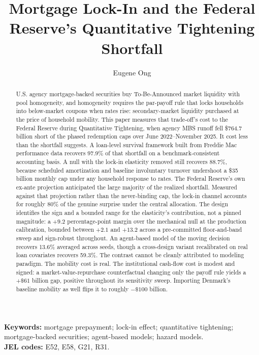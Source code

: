\documentclass[12pt]{article}
\title{Mortgage Lock-In and the Federal Reserve's Quantitative Tightening Shortfall}
\author{Eugene Ong}
\affil{Carnegie Mellon University}
\date{}
\begin{document}
\maketitle
\begin{abstract}
\noindent U.S. agency mortgage-backed securities buy To-Be-Announced market liquidity with pool homogeneity, and homogeneity requires the par-payoff rule that locks households into below-market coupons when rates rise: secondary-market liquidity purchased at the price of household mobility. This paper measures that trade-off's cost to the Federal Reserve during Quantitative Tightening, when agency MBS runoff fell \$764.7 billion short of the phased redemption caps over June 2022--November 2025. It cost less than the shortfall suggests. A loan-level survival framework built from Freddie Mac performance data recovers 97.9\% of that shortfall on a benchmark-consistent accounting basis. A null with the lock-in elasticity removed still recovers 88.7\%, because scheduled amortization and baseline involuntary turnover undershoot a \$35 billion monthly cap under any household response to rates. The Federal Reserve's own ex-ante projection anticipated the large majority of the realized shortfall. Measured against that projection rather than the never-binding cap, the lock-in channel accounts for roughly 80\% of the genuine surprise under the central allocation. The design identifies the sign and a bounded range for the elasticity's contribution, not a pinned magnitude: a $+9.2$ percentage-point margin over the mechanical null at the production calibration, bounded between $+2.1$ and $+13.2$ across a pre-committed floor-and-band sweep and sign-robust throughout. An agent-based model of the moving decision recovers 13.6\% averaged across seeds, though a cross-design variant recalibrated on real loan covariates recovers 59.3\%. The contrast cannot be cleanly attributed to modeling paradigm. The mobility cost is real. The institutional cash-flow cost is modest and signed: a market-value-repurchase counterfactual changing only the payoff rule yields a $+\$61$ billion gap, positive throughout its sensitivity sweep. Importing Denmark's baseline mobility as well flips it to roughly $-\$100$ billion.
\end{abstract}

\vspace{0.5\baselineskip}
{\footnotesize\noindent\textbf{Keywords:} mortgage prepayment; lock-in effect; quantitative tightening; mortgage-backed securities; agent-based models; hazard models.\\
\textbf{JEL codes:} E52, E58, G21, R31.\par}
\newpage
\end{document}
